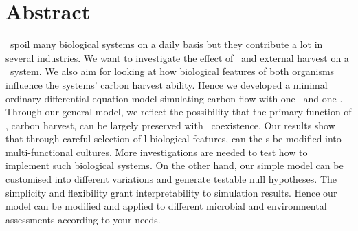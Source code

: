 \documentclass[../thesis.tex]{subfiles} %
\begin{document}
\section{Abstract}
\Bac\ spoil many biological systems on a daily basis but they contribute a lot in several industries.  We want to investigate the effect of \bac\ and external harvest on a \phy\ system.  We also aim for looking at how biological features of both organisms influence the systems' carbon harvest ability.  Hence we developed a minimal ordinary differential equation model simulating carbon flow with one \phy\ and one \bac.  Through our general model, we reflect the possibility that the primary function of \phy, carbon harvest, can be largely preserved with \bac\ coexistence.  Our results show that through careful selection of \bac l biological features, can the \pbs s be modified into multi-functional cultures.  More investigations are needed to test how to implement such biological systems.  On the other hand, our simple model can be customised into different variations and generate testable null hypotheses.  The simplicity and flexibility grant interpretability to simulation results.  Hence our model can be modified and applied to different microbial and environmental assessments according to your needs.
\end{document}
